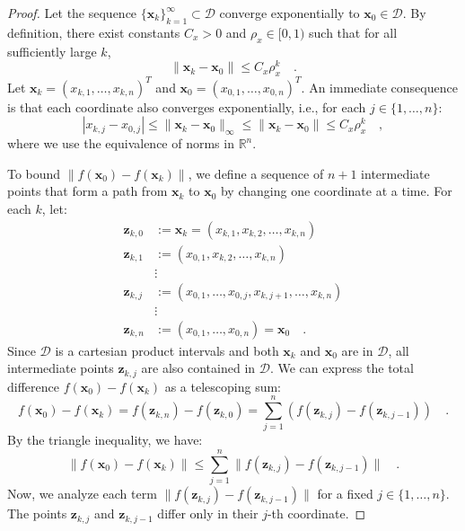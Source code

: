 \documentclass[../../main.tex]{subfiles}
\begin{document}
\begin{proof}
Let the sequence $\{\bm{x}_k\}_{k=1}^\infty \subset \mathcal{D}$ converge exponentially to $\bm{x}_0 \in \mathcal{D}$. By definition, there exist constants $C_x > 0$ and $\rho_x \in [0, 1)$ such that for all sufficiently large $k$,
\[
    \|\bm{x}_k - \bm{x}_0\| \le C_x \rho_x^k \quad .
\]
Let $\bm{x}_k = (x_{k,1}, \dots, x_{k,n})^T$ and $\bm{x}_0 = (x_{0,1}, \dots, x_{0,n})^T$. An immediate consequence is that each coordinate also converges exponentially, i.e., for each $j \in \{1, \dots, n\}$:
\[
    |x_{k,j} - x_{0,j}| \le \|\bm{x}_k - \bm{x}_0\|_{\infty} \le \|\bm{x}_k - \bm{x}_0\| \le C_x \rho_x^k \quad ,
\]
where we use the equivalence of norms in $\mathbb{R}^n$.

To bound $\|f(\bm{x}_0) - f(\bm{x}_k)\|$, we define a sequence of $n+1$ intermediate points that form a path from $\bm{x}_k$ to $\bm{x}_0$ by changing one coordinate at a time. For each $k$, let:
\begin{align*}
    \bm{z}_{k,0} &:= \bm{x}_k = (x_{k,1}, x_{k,2}, \dots, x_{k,n}) \\
    \bm{z}_{k,1} &:= (x_{0,1}, x_{k,2}, \dots, x_{k,n}) \\
    & \vdots \\
    \bm{z}_{k,j} &:= (x_{0,1}, \dots, x_{0,j}, x_{k,j+1}, \dots, x_{k,n}) \\
    & \vdots \\
    \bm{z}_{k,n} &:= (x_{0,1}, \dots, x_{0,n}) = \bm{x}_0 \quad .
\end{align*}
Since $\mathcal{D}$ is a cartesian product intervals and both $\bm{x}_k$ and $\bm{x}_0$ are in $\mathcal{D}$, all intermediate points $\bm{z}_{k,j}$ are also contained in $\mathcal{D}$. We can express the total difference $f(\bm{x}_0) - f(\bm{x}_k)$ as a telescoping sum:
\[
    f(\bm{x}_0) - f(\bm{x}_k) = f(\bm{z}_{k,n}) - f(\bm{z}_{k,0}) = \sum_{j=1}^{n} \left( f(\bm{z}_{k,j}) - f(\bm{z}_{k,j-1}) \right) \quad .
\]
By the triangle inequality, we have:
\[
    \|f(\bm{x}_0) - f(\bm{x}_k)\| \le \sum_{j=1}^{n} \|f(\bm{z}_{k,j}) - f(\bm{z}_{k,j-1})\| \quad .
\]
Now, we analyze each term $\|f(\bm{z}_{k,j}) - f(\bm{z}_{k,j-1})\|$ for a fixed $j \in \{1, \dots, n\}$. The points $\bm{z}_{k,j}$ and $\bm{z}_{k,j-1}$ differ only in their $j$-th coordinate.


\end{proof}
\end{document}
